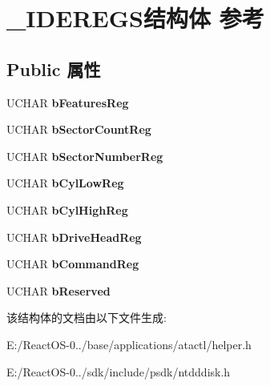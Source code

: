 \hypertarget{struct___i_d_e_r_e_g_s}{}\section{\+\_\+\+I\+D\+E\+R\+E\+G\+S结构体 参考}
\label{struct___i_d_e_r_e_g_s}
\subsection*{Public 属性}
\begin{DoxyCompactItemize}
\item 
\mbox{\label{struct___i_d_e_r_e_g_s_aefddea2bbc089b5fd608537c79efe99c}} 
U\+C\+H\+AR {\bfseries b\+Features\+Reg}
\item 
\mbox{\label{struct___i_d_e_r_e_g_s_a8caa8c7015b25389df57be88775dc02f}} 
U\+C\+H\+AR {\bfseries b\+Sector\+Count\+Reg}
\item 
\mbox{\label{struct___i_d_e_r_e_g_s_a41118e16006ecbd23a6745b6b6b67b2b}} 
U\+C\+H\+AR {\bfseries b\+Sector\+Number\+Reg}
\item 
\mbox{\label{struct___i_d_e_r_e_g_s_a424d48047bfe2e1657baad0dda977f5d}} 
U\+C\+H\+AR {\bfseries b\+Cyl\+Low\+Reg}
\item 
\mbox{\label{struct___i_d_e_r_e_g_s_a2dbe92b225898b8f1afa3eaa59dc6a66}} 
U\+C\+H\+AR {\bfseries b\+Cyl\+High\+Reg}
\item 
\mbox{\label{struct___i_d_e_r_e_g_s_a1f7f095bdec3c5141118017a7054ff98}} 
U\+C\+H\+AR {\bfseries b\+Drive\+Head\+Reg}
\item 
\mbox{\label{struct___i_d_e_r_e_g_s_af7eadcba4487df8dc0d091dfa2e787d6}} 
U\+C\+H\+AR {\bfseries b\+Command\+Reg}
\item 
\mbox{\label{struct___i_d_e_r_e_g_s_a29f6e0b80fce0869c92cc77e0e13bd8e}} 
U\+C\+H\+AR {\bfseries b\+Reserved}
\end{DoxyCompactItemize}


该结构体的文档由以下文件生成\+:\begin{DoxyCompactItemize}
\item 
E\+:/\+React\+O\+S-\/0../base/applications/atactl/helper.\+h\item 
E\+:/\+React\+O\+S-\/0../sdk/include/psdk/ntdddisk.\+h\end{DoxyCompactItemize}
